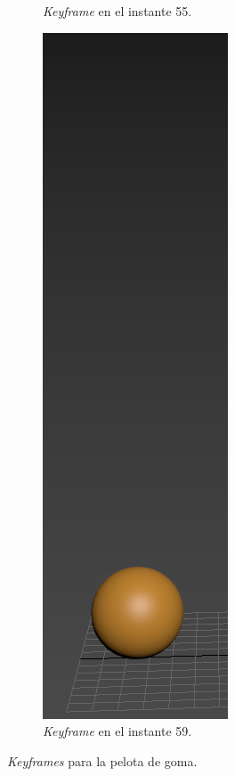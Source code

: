 \documentclass{article}
\begin{document}
\begin{figure}[H]
\begin{subfigure}[H]{0.15\textwidth}
	    \caption{\textit{Keyframe} en el instante 55.}
	\end{subfigure}
    \hfill
	\begin{subfigure}[H]{0.15\textwidth}
	    \centering
	    \includegraphics[width=\textwidth]{imagenes/Ejercicio 2/p1_suelo2.png}
	    \caption{\textit{Keyframe} en el instante 59.}
	\end{subfigure}
    \caption{\textit{Keyframes} para la pelota de goma.} 
\end{figure}
\end{document}
